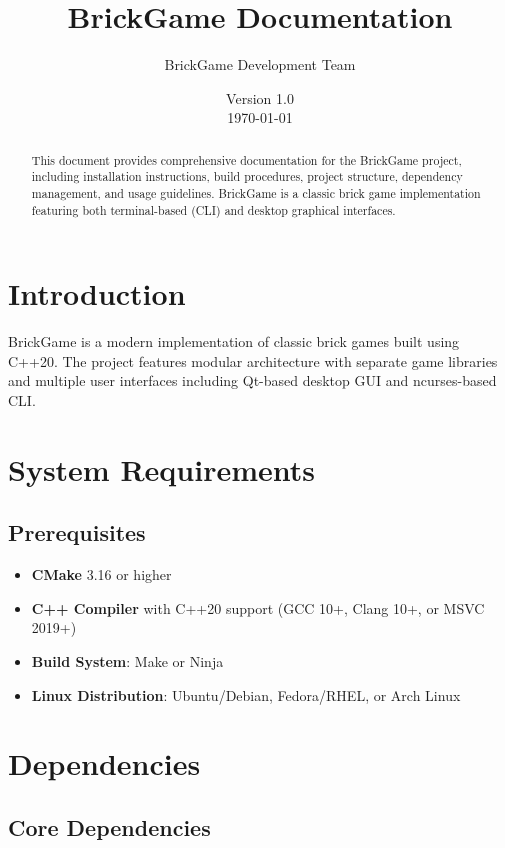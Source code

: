\documentclass[12pt]{article}
\title{BrickGame Documentation}
\author{BrickGame Development Team}
\date{Version 1.0 \\ \today}
\begin{document}
\maketitle

\begin{abstract}
This document provides comprehensive documentation for the BrickGame project, including installation instructions, build procedures, project structure, dependency management, and usage guidelines. BrickGame is a classic brick game implementation featuring both terminal-based (CLI) and desktop graphical interfaces.
\end{abstract}

\tableofcontents
\newpage

\section{Introduction}
BrickGame is a modern implementation of classic brick games built using C++20. The project features modular architecture with separate game libraries and multiple user interfaces including Qt-based desktop GUI and ncurses-based CLI.

\section{System Requirements}

\subsection{Prerequisites}
\begin{itemize}
    \item \textbf{CMake} 3.16 or higher
    \item \textbf{C++ Compiler} with C++20 support (GCC 10+, Clang 10+, or MSVC 2019+)
    \item \textbf{Build System}: Make or Ninja
    \item \textbf{Linux Distribution}: Ubuntu/Debian, Fedora/RHEL, or Arch Linux
\end{itemize}

\section{Dependencies}

\subsection{Core Dependencies}
\end{document}
